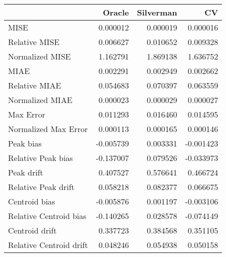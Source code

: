 \begin{tabular}{lrrr}
  \hline
 & Oracle & Silverman & CV \\ 
  \hline
MISE & 0.000012 & 0.000019 & 0.000016 \\ 
  Relative MISE & 0.006627 & 0.010652 & 0.009328 \\ 
  Normalized MISE & 1.162791 & 1.869138 & 1.636752 \\ 
  MIAE & 0.002291 & 0.002949 & 0.002662 \\ 
  Relative MIAE & 0.054683 & 0.070397 & 0.063559 \\ 
  Normalized MIAE & 0.000023 & 0.000029 & 0.000027 \\ 
  Max Error & 0.011293 & 0.016460 & 0.014595 \\ 
  Normalized Max Error & 0.000113 & 0.000165 & 0.000146 \\ 
  Peak bias & -0.005739 & 0.003331 & -0.001423 \\ 
  Relative Peak bias & -0.137007 & 0.079526 & -0.033973 \\ 
  Peak drift & 0.407527 & 0.576641 & 0.466724 \\ 
  Relative Peak drift & 0.058218 & 0.082377 & 0.066675 \\ 
  Centroid bias & -0.005876 & 0.001197 & -0.003106 \\ 
  Relative Centroid bias & -0.140265 & 0.028578 & -0.074149 \\ 
  Centroid drift & 0.337723 & 0.384568 & 0.351105 \\ 
  Relative Centroid drift & 0.048246 & 0.054938 & 0.050158 \\ 
   \hline
\end{tabular}
